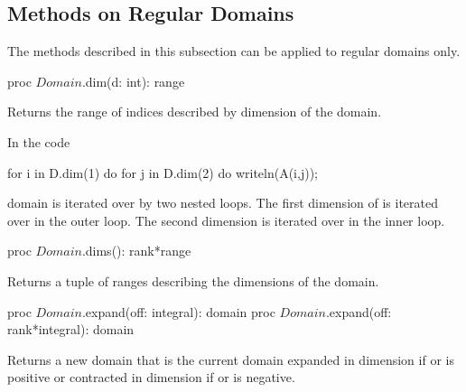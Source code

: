 \subsection{Methods on Regular Domains}

The methods described in this subsection can be applied to regular domains only.

\begin{protohead}
proc $Domain$.dim(d: int): range
\end{protohead}
\begin{protobody}
Returns the range of indices described by dimension  of the
domain.
\end{protobody}

\begin{example}
In the code
\begin{chapel}
for i in D.dim(1) do
  for j in D.dim(2) do
    writeln(A(i,j));
\end{chapel}
domain  is iterated over by two nested loops.  The first
dimension of  is iterated over in the outer loop.  The second
dimension is iterated over in the inner loop.
\end{example}

\begin{protohead}
proc $Domain$.dims(): rank*range
\end{protohead}
\begin{protobody}
Returns a tuple of ranges describing the dimensions of the domain.
\end{protobody}


\begin{protohead}
proc $Domain$.expand(off: integral): domain
proc $Domain$.expand(off: rank*integral): domain
\end{protohead}
\begin{protobody}
Returns a new domain that is the current domain expanded in
dimension  if  or  is positive or
contracted in dimension  if  or  is
negative.
\end{protobody}

